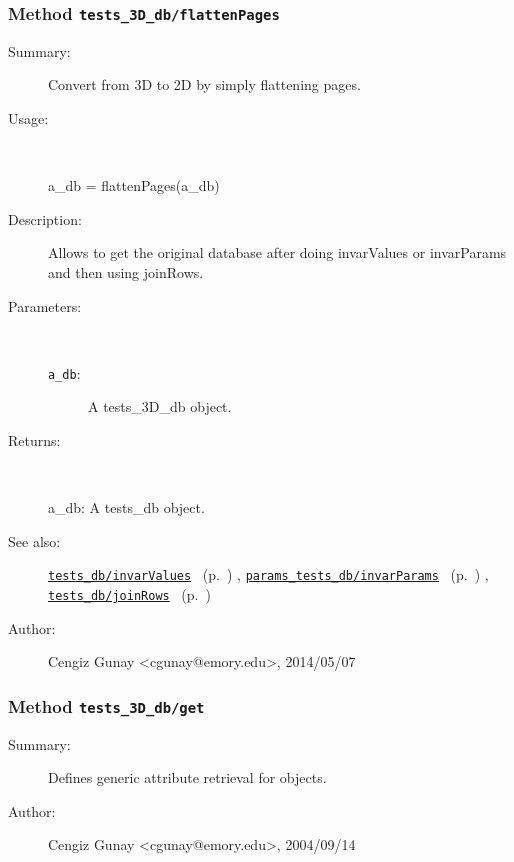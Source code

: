 \subsubsection[Method \texttt{flattenPages}]{Method \texttt{tests\_3D\_db/flattenPages}}%
%
\label{ref_tests_3D_db__flattenPages}%
\hypertarget{ref_tests_3D_db__flattenPages}{}%
\begin{description}
\item[Summary:]Convert from 3D to 2D by simply flattening pages.
%
\item[Usage:]~%
\begin{lyxcode}%
a\_db = flattenPages(a\_db)
%
\end{lyxcode}%
%
\item[Description:]%
Allows to get the original database after doing invarValues or
 invarParams and then using joinRows.
\item[Parameters:]~
\begin{description}%
\item[\texttt{a\_db}:]
 A tests\_3D\_db object.
\end{description}%
%
\item[Returns:
]~

   a\_db: A tests\_db object.
%
%
\item[See also:]%
\hyperlink{ref_tests_db__invarValues}{\texttt{tests\_db/invarValues}}%
\ (p.~\pageref{ref_tests_db__invarValues})%
%
, \hyperlink{ref_params_tests_db__invarParams}{\texttt{params\_tests\_db/invarParams}}%
\ (p.~\pageref{ref_params_tests_db__invarParams})%
%
, \hyperlink{ref_tests_db__joinRows}{\texttt{tests\_db/joinRows}}%
\ (p.~\pageref{ref_tests_db__joinRows})%
%
%
\item[Author:]%
Cengiz Gunay <cgunay@emory.edu>, 2014/05/07
%
\end{description}
\methodline%
\subsubsection[Method \texttt{get}]{Method \texttt{tests\_3D\_db/get}}%
%
\label{ref_tests_3D_db__get}%
\hypertarget{ref_tests_3D_db__get}{}%
\begin{description}
\item[Summary:]Defines generic attribute retrieval for objects.
%
%
%
%
%
%
%
\item[Author:]%
Cengiz Gunay <cgunay@emory.edu>, 2004/09/14
%
\end{description}
\methodline%
